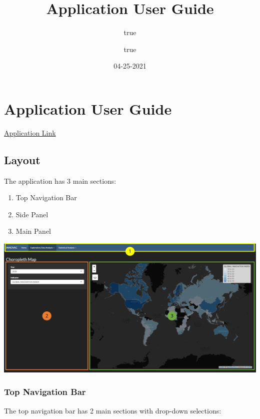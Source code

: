 \documentclass[
]{article}
\title{Application User Guide}
\author{true \and true}
\date{04-25-2021}
\providecommand{\tightlist}{%
  \setlength{\itemsep}{0pt}\setlength{\parskip}{0pt}}
\begin{document}
\maketitle

\hypertarget{application-user-guide}{%
\section{Application User Guide}\label{application-user-guide}}

\href{https://lanceteo89.shinyapps.io/INNOVAC/}{Application Link}

\hypertarget{layout}{%
\subsection{Layout}\label{layout}}

The application has 3 main sections:

\begin{enumerate}
\def\labelenumi{\arabic{enumi}.}
\tightlist
\item
  Top Navigation Bar
\item
  Side Panel
\item
  Main Panel
\end{enumerate}

\includegraphics{./images/layout.png}

\hypertarget{top-navigation-bar}{%
\subsubsection{Top Navigation Bar}\label{top-navigation-bar}}

The top navigation bar has 2 main sections with drop-down selections:
\end{document}
